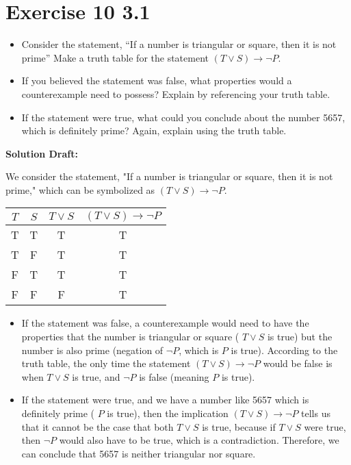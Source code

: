 \documentclass{article}
\begin{document}
\section*{Exercise 10 3.1}  
\begin{itemize}
    \item Consider the statement, “If a number is triangular or square, then it is not prime” Make a truth table for the statement \((T \lor S) \rightarrow \neg P\).
    \item If you believed the statement was false, what properties would a counterexample need to possess? Explain by referencing your truth table.
    \item If the statement were true, what could you conclude about the number 5657, which is definitely prime? Again, explain using the truth table.
\end{itemize}

\vspace{0.5cm}
\noindent\textbf{Solution Draft:} 
\vspace{0.2cm}

We consider the statement, "If a number is triangular or square, then it is not prime," which can be symbolized as \( (T \lor S) \rightarrow \neg P \).

\begin{tabular}{cc|c|c}
\(T\) & \(S\) & \(T \lor S\) & \((T \lor S) \rightarrow \neg P\) \\
\hline
T & T & T & T \\
T & F & T & T \\
F & T & T & T \\
F & F & F & T \\
\end{tabular}
\begin{itemize}
    \item If the statement was false, a counterexample would need to have the properties that the number is triangular or square ( \( T \lor S \) is true) but the number is also prime (negation of \( \neg P \), which is \( P \) is true). According to the truth table, the only time the statement \((T \lor S) \rightarrow \neg P\) would be false is when \( T \lor S \) is true, and \( \neg P \) is false (meaning \( P \) is true).
    \item If the statement were true, and we have a number like 5657 which is definitely prime ( \( P \) is true), then the implication \((T \lor S) \rightarrow \neg P\) tells us that it cannot be the case that both \( T \lor S \) is true, because if \( T \lor S \) were true, then \( \neg P \) would also have to be true, which is a contradiction. Therefore, we can conclude that 5657 is neither triangular nor square.
\end{itemize}
\end{document}
